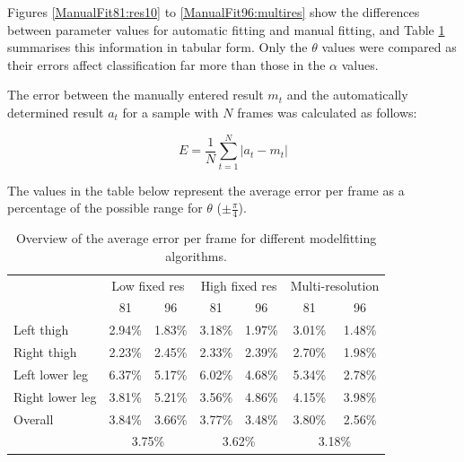 Figures \ref{ManualFit81:res10} to \ref{ManualFit96:multires} show the differences between parameter values for automatic fitting and manual fitting,
and Table \ref{ManualFitTable} summarises this information in tabular form.
Only the $\theta$ values were compared as their errors affect classification far more than those in the $\alpha$ values.

The error between the manually entered result $m_t$ and the automatically determined result $a_t$ for a sample with $N$ frames was calculated as follows:

\begin{equation}
	E = \frac{1}{N} \sum_{t=1}^N \left| a_t - m_t \right|
\end{equation}

The values in the table below represent the average error per frame as a percentage of the possible range for $\theta$ ($\pm \frac{\pi}{4}$).

\begin{table}[thb]
	\centering
	\begin{tabular}{l|cc|cc|cc}
		& \multicolumn{2}{|c|}{Low fixed res} & \multicolumn{2}{|c|}{High fixed res} & \multicolumn{2}{|c}{Multi-resolution} \\
		& 81 & 96 & 81 & 96 & 81 & 96 \\
		\hline
		Left thigh & 2.94\% & 1.83\% & 3.18\% & 1.97\% & 3.01\% & 1.48\% \\
		Right thigh & 2.23\% & 2.45\% & 2.33\% & 2.39\% & 2.70\% & 1.98\% \\
		Left lower leg & 6.37\% & 5.17\% & 6.02\% & 4.68\% & 5.34\% & 2.78\% \\
		Right lower leg & 3.81\% & 5.21\% & 3.56\% & 4.86\% & 4.15\% & 3.98\% \\
		\hline
		Overall & 3.84\% & 3.66\% & 3.77\% & 3.48\% & 3.80\% & 2.56\% \\
		& \multicolumn{2}{|c|}{3.75\%} & \multicolumn{2}{|c|}{3.62\%} & \multicolumn{2}{|c}{3.18\%} \\
	\end{tabular}
	\caption{Overview of the average error per frame for different modelfitting algorithms.}
	\label{ManualFitTable}
\end{table}

